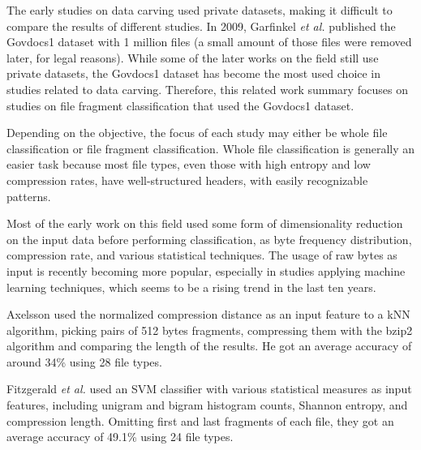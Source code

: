 The early studies on data carving used private datasets, making it difficult to compare the results of different studies. In 2009, Garfinkel \textit{et al.} \cite{garfinkel_bringing_2009} published the Govdocs1 dataset with 1 million files (a small amount of those files were removed later, for legal reasons). While some of the later works on the field still use private datasets, the Govdocs1 dataset has become the most used choice in studies related to data carving.
Therefore, this related work summary focuses on studies on file fragment classification that used the Govdocs1 dataset.

Depending on the objective, the focus of each study may either be whole file classification or file fragment classification. Whole file classification is generally an easier task because most file types, even those with high entropy and low compression rates, have well-structured headers, with easily recognizable patterns.

Most of the early work on this field used some form of dimensionality reduction on the input data before performing classification, as byte frequency distribution, compression rate, and various statistical techniques. The usage of raw bytes as input is recently becoming more popular, especially in studies applying machine learning techniques, which seems to be a rising trend in the last ten years.


Axelsson \cite{axelsson_normalised_2010} used the normalized compression distance as an input feature to a kNN algorithm, picking pairs of 512 bytes fragments, compressing them with the bzip2 algorithm and comparing the length of the results.
He got an average accuracy of around 34\% using 28 file types.


Fitzgerald \textit{et al.} \cite{fitzgerald_using_2012}  used an SVM classifier with various statistical measures as input features, including unigram and bigram histogram counts, Shannon entropy, and compression length.
Omitting first and last fragments of each file, they got an average accuracy of 49.1\% using 24 file types.

